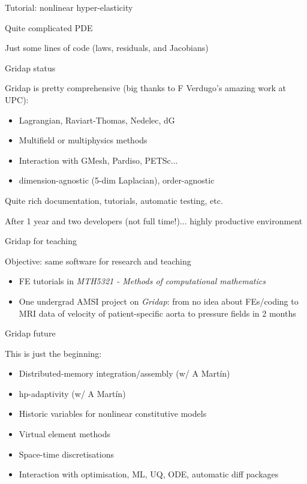 \begin{frame}{Tutorial: nonlinear hyper-elasticity}

Quite complicated PDE

Just some lines of code (laws, residuals, and Jacobians)

\end{frame}

\begin{frame}{Gridap status}

Gridap is pretty comprehensive (big thanks to F Verdugo's amazing work at UPC):

\begin{itemize}
\item Lagrangian, Raviart-Thomas, Nedelec, dG
\item Multifield or multiphysics methods
\item Interaction with GMesh, Pardiso, PETSc...
\item dimension-agnostic (5-dim Laplacian), order-agnostic
\end{itemize}

Quite rich documentation, tutorials, automatic testing, etc.

After 1 year and two developers (not full time!)... highly productive environment

\end{frame}

\begin{frame}{Gridap for teaching}

Objective: same software for research and teaching

\begin{itemize}
\item FE tutorials in \emph{MTH5321 - Methods of computational mathematics}
\item One undergrad AMSI project on \emph{Gridap}: from no idea about FEs/coding to MRI data of velocity of patient-specific aorta to pressure fields in 2 months
\end{itemize}

\end{frame}

\begin{frame}{Gridap future}

This is just the beginning:
\begin{itemize}
  \item Distributed-memory integration/assembly (w/ A Mart\'in)
  \item hp-adaptivity (w/ A Mart\'in)
  \item Historic variables for nonlinear constitutive models
  \item Virtual element methods
  \item Space-time discretisations
  \item Interaction with optimisation, ML, UQ, ODE, automatic diff packages
\end{itemize}
\end{frame}

